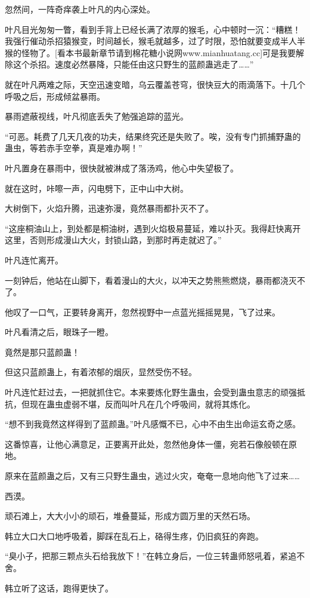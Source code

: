 \begin{this_body}
忽然间，一阵奇痒袭上叶凡的内心深处。

叶凡目光匆匆一瞥，看到手背上已经长满了浓厚的猴毛，心中顿时一沉：“糟糕！我强行催动杀招猿猴变，时间越长，猴毛就越多，过了时限，恐怕就要变成半人半猴的怪物了。[看本书最新章节请到棉花糖小说网www.mianhuatang.cc]可是我要解除这个杀招。速度必然暴降，只能任由这只野生的蓝颜蛊逃走了……”

就在叶凡两难之际，天空迅速变暗，乌云覆盖苍穹，很快豆大的雨滴落下。十几个呼吸之后，形成倾盆暴雨。

暴雨遮蔽视线，叶凡彻底丢失了勉强追踪的蓝光。

“可恶。耗费了几天几夜的功夫，结果终究还是失败了。唉，没有专门抓捕野蛊的蛊虫，等若赤手空拳，真是难办啊！”

叶凡置身在暴雨中，很快就被淋成了落汤鸡，他心中失望极了。

就在这时，咔嚓一声，闪电劈下，正中山中大树。

大树倒下，火焰升腾，迅速弥漫，竟然暴雨都扑灭不了。

“这座桐油山上，到处都是桐油树，遇到火焰极易蔓延，难以扑灭。我得赶快离开这里，否则形成漫山大火，封锁山路，到那时再走就迟了。”

叶凡连忙离开。

一刻钟后，他站在山脚下，看着漫山的大火，以冲天之势熊熊燃烧，暴雨都浇灭不了。

他叹了一口气，正要转身离开，忽然视野中一点蓝光摇摇晃晃，飞了过来。

叶凡看清之后，眼珠子一瞪。

竟然是那只蓝颜蛊！

但这只蓝颜蛊上，有着浓郁的烟灰，显然受伤不轻。

叶凡连忙赶过去，一把就抓住它。本来要炼化野生蛊虫，会受到蛊虫意志的顽强抵抗，但现在蛊虫虚弱不堪，反而叫叶凡在几个呼吸间，就将其炼化。

“想不到我竟然这样得到了蓝颜蛊。”叶凡感慨不已，心中不由生出命运玄奇之感。

这番惊喜，让他心满意足，正要离开此处，忽然他身体一僵，宛若石像般顿在原地。

原来在蓝颜蛊之后，又有三只野生蛊虫，逃过火灾，奄奄一息地向他飞了过来……

西漠。

顽石滩上，大大小小的顽石，堆叠蔓延，形成方圆万里的天然石场。

韩立大口大口地呼吸着，脚踩在乱石上，硌得生疼，仍旧疯狂的奔跑。

“臭小子，把那三颗点头石给我放下！”在韩立身后，一位三转蛊师怒吼着，紧追不舍。

韩立听了这话，跑得更快了。


\end{this_body}
